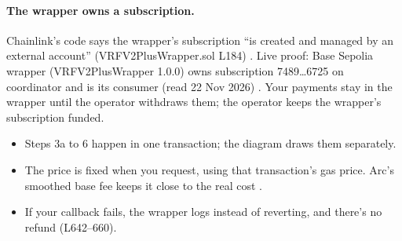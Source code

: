\documentclass[11pt,a4paper]{article}
\begin{document}
\paragraph{The wrapper owns a subscription.} Chainlink's code says the wrapper's subscription ``is created and managed by an external account'' (VRFV2PlusWrapper.sol L184) \cite{clwrapper}. Live proof: Base Sepolia wrapper  (VRFV2PlusWrapper 1.0.0) owns subscription 7489\ldots6725 on coordinator  and is its consumer (read 22 Nov 2026) \cite{bswrapper}. Your payments stay in the wrapper until the operator withdraws them; the operator keeps the wrapper's subscription funded.

\begin{itemize}
  \item Steps 3a to 6 happen in one transaction; the diagram draws them separately.
  \item The price is fixed when you request, using that transaction's gas price. Arc's smoothed base fee keeps it close to the real cost \cite{arcfee}.
  \item If your callback fails, the wrapper logs  instead of reverting, and there's no refund (L642--660).
\end{itemize}
\end{document}
